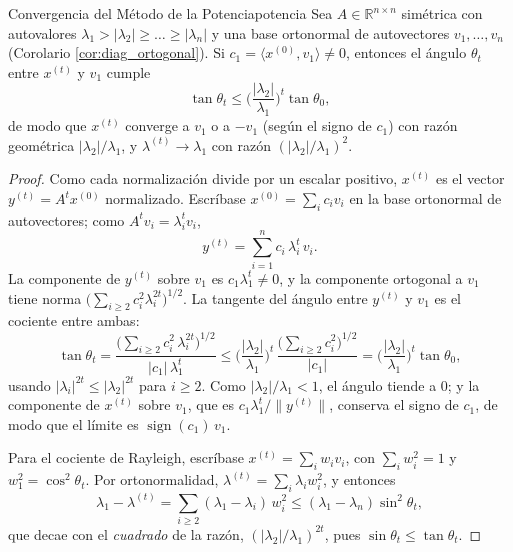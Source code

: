 \documentclass[11pt, a4paper]{article}
\begin{document}
\begin{teorema}{Convergencia del Método de la Potencia}{potencia}
Sea $A \in \mathbb{R}^{n \times n}$ simétrica con autovalores $\lambda_1 > |\lambda_2| \ge \dots \ge |\lambda_n|$ y una base ortonormal de autovectores $v_1, \dots, v_n$ (Corolario \ref{cor:diag_ortogonal}). Si $c_1 = \langle x^{(0)}, v_1 \rangle \neq 0$, entonces el ángulo $\theta_t$ entre $x^{(t)}$ y $v_1$ cumple
\[
\tan \theta_t \le \Big( \frac{|\lambda_2|}{\lambda_1} \Big)^{\! t} \tan \theta_0,
\]
de modo que $x^{(t)}$ converge a $v_1$ o a $-v_1$ (según el signo de $c_1$) con razón geométrica $|\lambda_2| / \lambda_1$, y $\lambda^{(t)} \to \lambda_1$ con razón $(|\lambda_2| / \lambda_1)^2$.
\end{teorema}

\begin{proof}
Como cada normalización divide por un escalar positivo, $x^{(t)}$ es el vector $y^{(t)} = A^t x^{(0)}$ normalizado. Escríbase $x^{(0)} = \sum_i c_i v_i$ en la base ortonormal de autovectores; como $A^t v_i = \lambda_i^t v_i$,
\[
y^{(t)} = \sum_{i=1}^{n} c_i \, \lambda_i^t \, v_i.
\]
La componente de $y^{(t)}$ sobre $v_1$ es $c_1 \lambda_1^t \neq 0$, y la componente ortogonal a $v_1$ tiene norma $\big( \sum_{i \ge 2} c_i^2 \lambda_i^{2t} \big)^{1/2}$. La tangente del ángulo entre $y^{(t)}$ y $v_1$ es el cociente entre ambas:
\[
\tan \theta_t = \frac{\big( \sum_{i \ge 2} c_i^2 \, \lambda_i^{2t} \big)^{1/2}}{|c_1| \, \lambda_1^t}
\le \Big( \frac{|\lambda_2|}{\lambda_1} \Big)^{\! t} \, \frac{\big( \sum_{i \ge 2} c_i^2 \big)^{1/2}}{|c_1|}
= \Big( \frac{|\lambda_2|}{\lambda_1} \Big)^{\! t} \tan \theta_0,
\]
usando $|\lambda_i|^{2t} \le |\lambda_2|^{2t}$ para $i \ge 2$. Como $|\lambda_2| / \lambda_1 < 1$, el ángulo tiende a $0$; y la componente de $x^{(t)}$ sobre $v_1$, que es $c_1 \lambda_1^t / \|y^{(t)}\|$, conserva el signo de $c_1$, de modo que el límite es $\operatorname{sign}(c_1) \, v_1$.

Para el cociente de Rayleigh, escríbase $x^{(t)} = \sum_i w_i v_i$, con $\sum_i w_i^2 = 1$ y $w_1^2 = \cos^2 \theta_t$. Por ortonormalidad, $\lambda^{(t)} = \sum_i \lambda_i w_i^2$, y entonces
\[
\lambda_1 - \lambda^{(t)} = \sum_{i \ge 2} (\lambda_1 - \lambda_i) \, w_i^2 \le (\lambda_1 - \lambda_n) \sin^2 \theta_t,
\]
que decae con el \emph{cuadrado} de la razón, $(|\lambda_2| / \lambda_1)^{2t}$, pues $\sin \theta_t \le \tan \theta_t$.
\end{proof}
\end{document}
